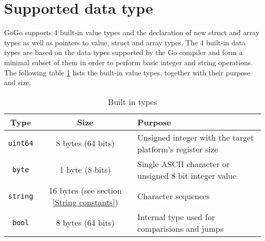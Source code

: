 \documentclass[a4paper]{scrreprt}
\begin{document}
    \section{Supported data type}
      GoGo supports 4 built-in value types and the declaration of new struct and array types as well as pointers to value, struct and array types. The 4 built-in data types are based on the data types supported by the Go compiler and form a minimal subset of them in order to perform basic integer and string operations. The following table \ref{tbl:types} lists the built-in value types, together with their purpose and size.
      
      \begin{table}[htb]
      \centering
      \begin{tabular}{cc p{}}
        \toprule
        \textbf{Type} & \textbf{Size} & \textbf{Purpose}\\
        \midrule
        \texttt{uint64} & 8 bytes (64 bits) & Unsigned integer with the target platform's register size\\
        \texttt{byte} & 1 byte (8 bits) & Single ASCII character or unsigned 8 bit integer value\\
        \texttt{string} & 16 bytes (see section \ref{String constants}) & Character sequences\\
        \texttt{bool} & 8 bytes (64 bits) & Internal type used for comparisions and jumps\\
        \bottomrule
      \end{tabular}
      \caption{Built in types}
      \label{tbl:types}
	  \end{table}
\end{document}
